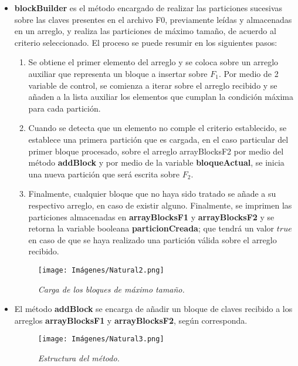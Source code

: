\documentclass[letterpaper,12pt]{extarticle}
\begin{document}
\begin{itemize}
\item \textbf{blockBuilder} es el método encargado de realizar las particiones sucesivas sobre las claves presentes en el archivo F0, previamente leídas y almacenadas en un arreglo, y realiza las particiones de máximo tamaño, de acuerdo al criterio seleccionado. El proceso se puede resumir en los siguientes pasos:

\begin{enumerate}
\item Se obtiene el primer elemento del arreglo y se coloca sobre un arreglo auxiliar que representa un bloque a insertar sobre $F_{1}$. Por medio de 2 variable de control, se comienza a iterar sobre el arreglo recibido y se añaden a la lista auxiliar los elementos que cumplan la condición máxima para cada partición.

\item Cuando se detecta que un elemento no comple el criterio establecido, se establece una primera partición que es cargada, en el caso particular del primer bloque procesado, sobre el arreglo arrayBlocksF2 por medio del método \textbf{addBlock} y por medio de la variable \textbf{bloqueActual}, se inicia una nueva partición que será escrita sobre $F_{2}$.

\item Finalmente, cualquier bloque que no haya sido tratado se añade a su respectivo arreglo, en caso de existir alguno. Finalmente, se imprimen las particiones almacenadas en \textbf{arrayBlocksF1} y \textbf{arrayBlocksF2} y se retorna la variable booleana \textbf{particionCreada}; que tendrá un valor $true$ en caso de que se haya realizado una partición válida sobre el arreglo recibido.


\end{enumerate}

\begin{figure}[h!]
    \centering
    \texttt{[image: Imágenes/Natural2.png]}
    \caption{\textit{Carga de los bloques de máximo tamaño.}}
    \label{fig:Natural2}
    \end{figure} 
    
\item El método \textbf{addBlock} se encarga de añadir un bloque de claves recibido a los arreglos \textbf{arrayBlocksF1} y \textbf{arrayBlocksF2}, según corresponda.

\begin{figure}[h!]
    \centering
    \texttt{[image: Imágenes/Natural3.png]}
    \caption{\textit{Estructura del método.}}
    \label{fig:Natural3}
    \end{figure} 


\end{itemize}
\end{document}
